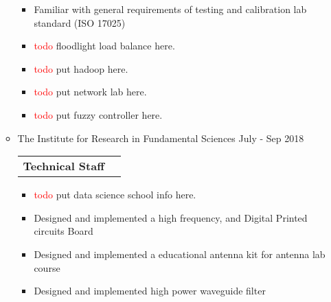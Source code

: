 \documentclass[a4paper,10pt]{article} %
\begin{document}
\begin{itemize}
\begin{itemize}
\begin{itemize}
	 		\item 
	 		Familiar with general requirements of testing and calibration lab standard  (ISO 17025)\\
	 		\item \textcolor{red}{todo} floodlight load balance here.
	 		\item \textcolor{red}{todo} put hadoop here.
	 		\item \textcolor{red}{todo} put network lab here.
	 		\item \textcolor{red}{todo} put fuzzy controller here.
	 	\end{itemize}
	 		
	 	\item 
	 	\textcolor{blue(ryb)}{The Institute for Research in Fundamental Sciences} \hfill July - Sep 2018 \\
	 	\begin{tabular}{lr}
	 		{\bf Technical Staff}& \\
	 	\end{tabular}
	 	\begin{itemize} 	
	 		\item \textcolor{red}{todo} put data science school info here.
	 		\item
	 		Designed and implemented a high frequency, and Digital Printed circuits Board  
	 		\item
	 		Designed and implemented a educational antenna kit for antenna lab course 
	 		\item
	 		Designed and implemented high power waveguide filter   \\
	 	\end{itemize}
	 	
	 \end{itemize}
\end{itemize}
\end{document}

